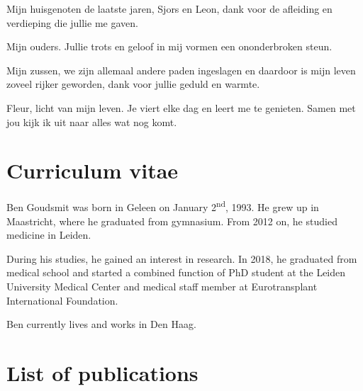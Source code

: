 \documentclass[11pt,english,]{book} %
\begin{document}
Mijn huisgenoten de laatste jaren, Sjors en Leon, dank voor de afleiding en verdieping die jullie me gaven.

Mijn ouders. Jullie trots en geloof in mij vormen een ononderbroken steun.

Mijn zussen, we zijn allemaal andere paden ingeslagen en daardoor is mijn leven zoveel rijker geworden, dank voor jullie geduld en warmte.

Fleur, licht van mijn leven. Je viert elke dag en leert me te genieten. Samen met jou kijk ik uit naar alles wat nog komt.

\newpage
\thispagestyle{plain}

\mbox{}

\pagecolor{black}
\color{white}

\hypertarget{curriculum-vitae}{%
\chapter*{Curriculum vitae}\label{curriculum-vitae}}

\newpage
\nopagecolor
\color{black}

Ben Goudsmit was born in Geleen on January 2\textsuperscript{nd}, 1993. He grew up in Maastricht, where he graduated from gymnasium. From 2012 on, he studied medicine in Leiden.

During his studies, he gained an interest in research. In 2018, he graduated from medical school and started a combined function of PhD student at the Leiden University Medical Center and medical staff member at Eurotransplant International Foundation.

Ben currently lives and works in Den Haag.

\newpage
\thispagestyle{plain}

\mbox{}

\pagecolor{black}
\color{white}

\hypertarget{list-of-publications}{%
\chapter*{List of publications}\label{list-of-publications}}

\newpage
\nopagecolor
\color{black}
\linespread{1.1}
\end{document}
